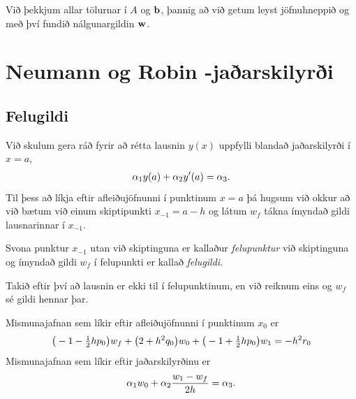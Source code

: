 \documentclass[letterpaper,10pt,icelandic]{sphinxmanual}
\begin{document}
Við þekkjum allar tölurnar í \(A\) og \(\bf b\), þannig að
við getum leyst jöfnuhneppið og með því fundið
nálgunargildin \(\bf w\).


\section{Neumann og Robin -jaðarskilyrði}
\label{kafli07:index-4}\label{kafli07:neumann-og-robin-jaarskilyri}

\subsection{Felugildi}
\label{kafli07:felugildi}
Við skulum gera ráð fyrir að rétta lausnin \(y(x)\) uppfylli blandað
jaðarskilyrði í \(x=a\),
\begin{gather}
\begin{split}\alpha_1y(a)+\alpha_2 y'(a)=\alpha_3.\end{split}\notag
\end{gather}
Til þess að líkja eftir afleiðujöfnunni í punktinum \(x=a\) þá
hugsum við okkur að við bætum við einum skiptipunkti \(x_{-1}=a-h\) og
látum \(w_f\) tákna ímyndað gildi lausnarinnar í \(x_{-1}\).

Svona punktur \(x_{-1}\) utan við skiptinguna er kallaður
\emph{felupunktur} við skiptinguna og ímyndað gildi \(w_f\) í felupunkti
er kallað \emph{felugildi}.

Takið eftir því að lausnin er ekki til í felupunktinum, en við reiknum
eins og \(w_f\) sé gildi hennar þar.

Mismunajafnan sem líkir eftir afleiðujöfnunni í punktinum \(x_0\) er
\begin{gather}
\begin{split}\big(-1-\tfrac 12 hp_0\big)w_f+\big(2+h^2 q_0\big)w_0
+\big(-1+\tfrac 12 hp_0\big)w_1=-h^2r_0\end{split}\notag
\end{gather}
Mismunajafnan sem líkir eftir jaðarskilyrðinu er
\begin{gather}
\begin{split}\alpha_1w_0+\alpha_2 \dfrac{w_1-w_f}{2h}=\alpha_3.\end{split}\notag
\end{gather}
\end{document}
